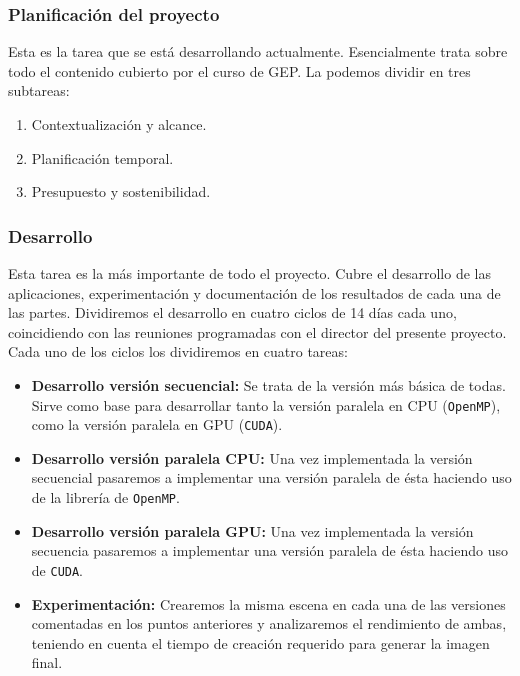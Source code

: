 \documentclass[titlepage,12pt]{report}
\begin{document}
\subsubsection{Planificación del proyecto}

Esta es la tarea que se está desarrollando actualmente. Esencialmente trata sobre todo el contenido cubierto por el curso de GEP. La podemos dividir en tres subtareas:

\begin{enumerate}
		\item Contextualización y alcance.
		\item Planificación temporal.
		\item Presupuesto y sostenibilidad.
\end{enumerate}

\subsubsection{Desarrollo}

Esta tarea es la más importante de todo el proyecto. Cubre el desarrollo de las aplicaciones, experimentación y documentación de los resultados de cada una de las partes. Dividiremos el desarrollo en cuatro ciclos de 14 días cada uno, coincidiendo con las reuniones programadas con el director del presente proyecto. Cada uno de los ciclos los dividiremos en cuatro tareas:

\begin{itemize}

	\item \textbf{Desarrollo versión secuencial:} Se trata de la versión más básica de todas. Sirve como base para desarrollar tanto la versión paralela en CPU (\texttt{OpenMP}), como la versión paralela en GPU (\texttt{CUDA}).
	
	\item \textbf{Desarrollo versión paralela CPU:} Una vez implementada la versión secuencial pasaremos a implementar una versión paralela de ésta haciendo uso de la librería de \texttt{OpenMP}. 
	
	\item \textbf{Desarrollo versión paralela GPU:} Una vez implementada la versión secuencia pasaremos a implementar una versión paralela de ésta haciendo uso de \texttt{CUDA}.

	\item \textbf{Experimentación:} Crearemos la misma escena en cada una de las versiones comentadas en los puntos anteriores y analizaremos el rendimiento de ambas, teniendo en cuenta el tiempo de creación requerido para generar la imagen final.

\end{itemize}
\end{document}
